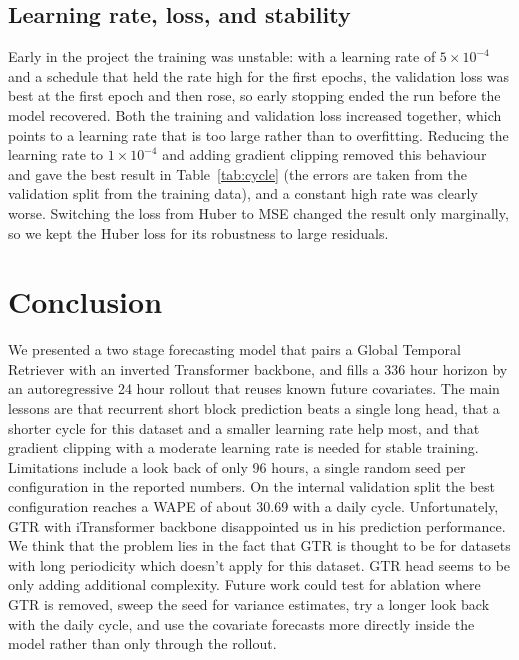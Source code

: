 \documentclass[11pt]{article}
\begin{document}
\subsection{Learning rate, loss, and stability}
Early in the project the training was unstable: with a learning rate of $5\times10^{-4}$ and a
schedule that held the rate high for the first epochs, the validation loss was best at the first
epoch and then rose, so early stopping ended the run before the model recovered. Both the
training and validation loss increased together, which points to a learning rate that is too
large rather than to overfitting. Reducing the learning rate to $1\times10^{-4}$ and adding
gradient clipping removed this behaviour and gave the best result in Table~\ref{tab:cycle} 
(the errors are taken from the validation split from the training data), and a
constant high rate was clearly worse. Switching the loss from Huber to MSE 
changed the result only marginally, so we kept the Huber loss for its robustness to
large residuals.

\section{Conclusion}
We presented a two stage forecasting model that pairs a Global Temporal Retriever \cite{cao2026gtr} with an
inverted Transformer backbone, and fills a 336 hour horizon
by an autoregressive 24 hour rollout that reuses known future covariates. The main lessons are that recurrent 
short block prediction beats a single long head, that a shorter cycle for this dataset and a smaller learning 
rate help most, and that gradient clipping with a moderate learning rate is needed for stable training. 
Limitations include a look back of only 96 hours, a single random
seed per configuration in the reported numbers. On the internal validation split the best configuration 
reaches a WAPE of about 30.69 with a daily cycle. Unfortunately, GTR \cite{cao2026gtr} with iTransformer \cite{liu2024itransformer} 
backbone disappointed us in his prediction performance. We think that the problem lies in the fact that 
GTR \cite{cao2026gtr} is thought to be for datasets with long periodicity which doesn't apply for this 
dataset. GTR \cite{cao2026gtr} head seems to be only adding additional complexity. Future work could test 
for ablation where GTR \cite{cao2026gtr} is removed, sweep the seed for variance estimates, try a longer 
look back with the daily cycle, and use the covariate forecasts more directly inside the model rather than 
only through the rollout.
\end{document}

